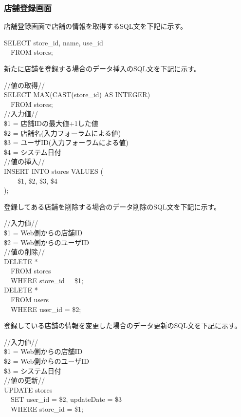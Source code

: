 \documentclass[a4j]{jarticle}
\begin{document}
\subsubsection{店舗登録画面}
店舗登録画面で店舗の情報を取得するSQL文を下記に示す。
\begin{screen}
  SELECT store\_id, name, use\_id \\
  　FROM stores;
\end{screen}
新たに店舗を登録する場合のデータ挿入のSQL文を下記に示す。
\begin{screen}
  //値の取得// \\
  SELECT MAX(CAST(store\_id) AS INTEGER) \\
  　FROM stores; \\

  //入力値// \\
  \$1 = 店舗IDの最大値+1した値 \\
  \$2 = 店舗名(入力フォーラムによる値) \\
  \$3 = ユーザID(入力フォーラムによる値) \\
  \$4 = システム日付 \\

  //値の挿入// \\
  INSERT INTO stores VALUES ( \\
  　　\$1, \$2, \$3, \$4 \\
  );
\end{screen}
登録してある店舗を削除する場合のデータ削除のSQL文を下記に示す。
\begin{screen}
  //入力値// \\
  \$1 = Web側からの店舗ID \\
  \$2 = Web側からのユーザID \\

  //値の削除// \\
  DELETE * \\
  　FROM stores \\
  　WHERE store\_id = \$1; \\

  DELETE * \\
  　FROM users \\
  　WHERE user\_id = \$2;
\end{screen}
登録している店舗の情報を変更した場合のデータ更新のSQL文を下記に示す。
\begin{screen}
  //入力値// \\
  \$1 = Web側からの店舗ID \\
  \$2 = Web側からのユーザID \\
  \$3 = システム日付 \\

  //値の更新// \\
  UPDATE stores \\
  　SET user\_id = \$2, updateDate = \$3 \\
  　WHERE store\_id = \$1;
\end{screen}
\end{document}
